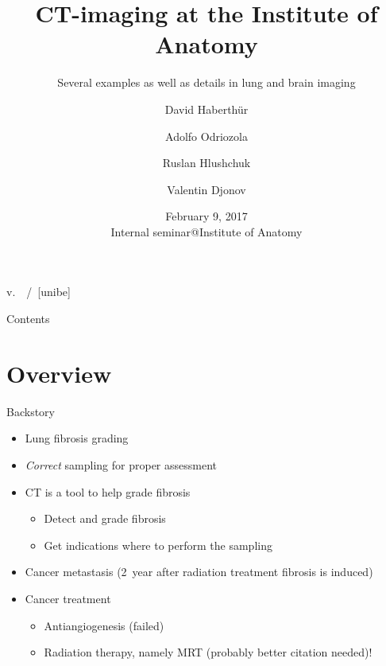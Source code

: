 \documentclass[draft,caption=numbered]{beamer}
\subtitle{Several examples as well as details in lung and brain imaging}
\author[David Haberthür]{David Haberthür \and\tiny Adolfo Odriozola \and Ruslan Hlushchuk \and Valentin Djonov}
\institute{Institute of Anatomy\\Universität Bern}
\date{February 9, 2017\\Internal seminar@Institute of Anatomy}
\newcommand{\uct}{\si{\micro}CT\xspace}
\begin{document}
\title[\si{\micro}CT in biological studies]{\si{\micro}CT-imaging at the Institute of Anatomy} %

{%
	\hspace*{\fill}%
	\insertshortauthor%
	\hspace*{\fill}%
	\insertshorttitle%
	\hspace*{\fill}%
	v.~\gitAbbrevHash%
	\hspace*{\fill}%
	\insertframenumber\,/\,\insertpresentationendpage%
	\hspace*{\fill}%
	\vskip2pt%
}
[unibe]

{
\begin{frame}
  \titlepage
\end{frame}
}
\addtocounter{framenumber}{1}

\begin{frame}{Contents}
	\tableofcontents
\end{frame}

\section{Overview}
\begin{frame}{Backstory}
    \begin{itemize}
        \item Lung fibrosis grading \cite{Ashcroft1988a}
        \item \emph{Correct} sampling for proper assessment
        \item \uct is a tool to help grade fibrosis
        \begin{itemize}
            \item Detect and grade fibrosis
            \item Get indications where to perform the sampling
        \end{itemize}
        \item Cancer metastasis (\SI{2}{year} after radiation treatment fibrosis is induced)
        \item Cancer treatment
        \begin{itemize}
            \item Antiangiogenesis (failed)
            \item Radiation therapy, namely MRT \cite{Bronnimann2016} (probably better citation needed)!
        \end{itemize}
    \end{itemize}
\end{frame}
\end{document}
